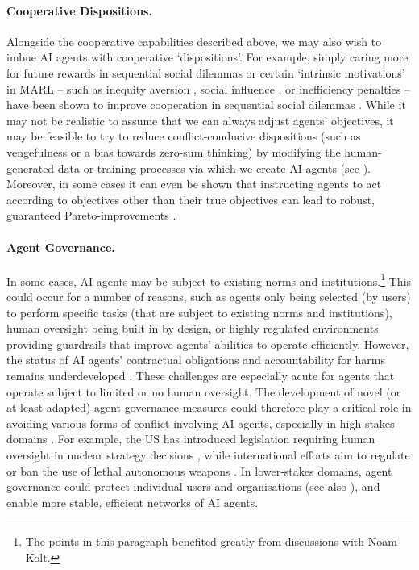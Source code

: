 \paragraph{Cooperative Dispositions.}
Alongside the cooperative capabilities described above, we may also wish to imbue AI agents with {cooperative `dispositions'}.
For example, simply caring more for future rewards in sequential social dilemmas \citep{BarfussEtAl2020} or certain `intrinsic motivations' in MARL -- such as inequity aversion \citep{Hughes2018}, social influence \citep{Jaques2019}, or inefficiency penalties \citep{Gemp2022} -- have been shown to improve cooperation in sequential social dilemmas \citep{Leibo2017,Wang2019}.
While it may not be realistic to assume that we can always adjust agents' objectives, it may be feasible to 
try to reduce conflict-conducive dispositions (such as vengefulness or a bias towards zero-sum thinking) by 
modifying the human-generated data or training processes via which we create AI agents (see 
).
Moreover, in some cases it can even be shown that instructing agents to act according to objectives other than their true objectives can lead to robust, guaranteed Pareto-improvements \citep{oesterheld2022safe}.

\paragraph{Agent Governance.}
In some cases, AI agents may be subject to existing norms and institutions.\footnote{The points in this paragraph benefited greatly from discussions with Noam Kolt.}
This could occur for a number of reasons, such as agents only being selected (by users) to perform specific tasks (that are subject to existing norms and institutions), human oversight being built in by design, or highly regulated environments providing guardrails that improve agents' abilities to operate efficiently.
However, the status of AI agents' contractual obligations and accountability for harms remains underdeveloped \citep[see also ]{ayres_law_2024, lima_could_2017, lior_ai_2019, Kolt2024, Chopra2011, Solum1992}.
These challenges are especially acute for agents that operate subject to limited or no human oversight.
The development of novel (or at least adapted) agent governance measures could therefore play a critical role in avoiding various forms of conflict involving AI agents, especially in high-stakes domains \citep{reuel2024generative,Kolt2025}.
For example, the US has introduced legislation requiring human oversight in nuclear strategy decisions \citep{Congress2023}, while international efforts aim to regulate or ban the use of lethal autonomous weapons \citep{ccw_laws_background}.
In lower-stakes domains, agent governance could protect individual users and organisations (see also ), and enable more stable, efficient networks of AI agents.

